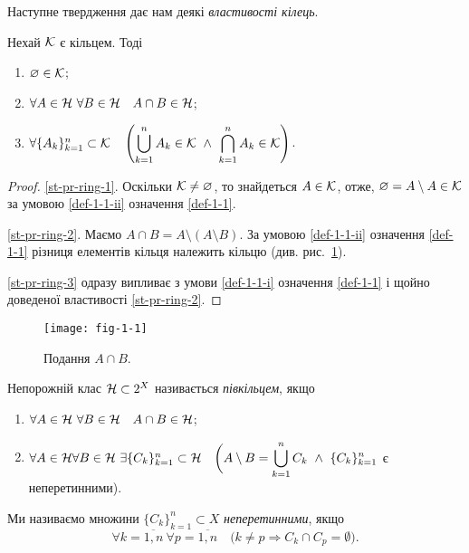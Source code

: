 Наступне твердження дає нам деякі \emph{властивості кілець}.

\begin{statement}
	\label{st-pr-ring}
	Нехай $\mathcal K$ є кільцем. Тоді
	\begin{enumerate}
		\item \label{st-pr-ring-1}
		$\varnothing\in\mathcal K$;
		\item \label{st-pr-ring-2}
		$\forall A\in\mathcal H\ \forall B\in\mathcal H\quad A\cap B\in\mathcal H $;
		\item \label{st-pr-ring-3}
		$\forall \{A_k\}_{k=1}^n\subset\mathcal K \quad 
		\displaystyle \left(\bigcup_{k=1}^n A_k\in\mathcal K \  \land \  \bigcap_{k=1}^n A_k\in\mathcal K\right)$.
	\end{enumerate}
\end{statement}

\begin{proof}
	\ref{st-pr-ring-1}.
	Оскільки $\mathcal K\neq\varnothing$, то знайдеться  $A\in\mathcal K$, отже, $\varnothing=A\setminus A\in\mathcal K$ за умовою \ref{def-1-1-ii} означення \ref{def-1-1}.
	
	\ref{st-pr-ring-2}.
	Маємо $A\cap B=A\setminus(A\setminus B)$. За умовою \ref{def-1-1-ii} означення \ref{def-1-1} різниця елементів кільця належить кільцю (див. рис.~\ref{fig-1-1}).
	
	\ref{st-pr-ring-3} одразу випливає з умови \ref{def-1-1-i} означення \ref{def-1-1} і щойно доведеної властивості \ref{st-pr-ring-2}.
\end{proof}

\begin{figure}[!h]
	\centering
	\texttt{[image: fig-1-1]}
	\caption{Подання $A\cap B$.}
	\label{fig-1-1}
\end{figure}

\begin{definition}
	\label{def-1-3}
	Непорожній клас $\mathcal H\subset 2^X$ називається \emph{півкільцем}, якщо
	\begin{enumerate}[label={\upshape (\roman*)}]
		\item \label{def-1-3-i}
		$\forall A\in\mathcal H\ \forall B\in\mathcal H\quad A\cap B\in\mathcal H $;
		\item \label{def-1-3-ii}
		$\forall A\in\HH \forall B\in\HH\ \exists \{C_k\}_{k=1}^n\subset\HH\quad 
		\displaystyle \bigg(A\setminus B= \bigcup_{k=1}^n C_k\  \land \ \{C_k\}_{k=1}^n$ є неперетинними\bigg).
	\end{enumerate}
\end{definition}

Ми називаємо множини $\{C_k\}_{k=1}^n\subset X$ \emph{неперетинними}, якщо
$$
\forall k=\overline{1,n}\ \forall p=\overline{1,n}\quad \big(k\neq p \Rightarrow C_k\cap C_p=\emptyset\big).
$$

